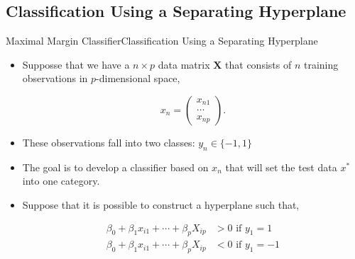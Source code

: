 \subsection{Classification Using a Separating Hyperplane}
\begin{frame}{Maximal Margin Classifier}{Classification Using a Separating Hyperplane}

\begin{itemize}
    \item Supposse that we have a $n \times p$ data matrix $\textbf{X}$ that consists of $n$ training observations in $p$-dimensional space, \pause 

    \begin{equation}
    x_n = 
    \begin{pmatrix}
    x_{n1} \\
    \hdots  \\
    x_{np} 
    \end{pmatrix}.
    \end{equation} \pause 

    \item These observations fall into two classes: $y_n \in \{ -1,1 \}$ \pause 

    \item The goal is to develop a classifier based on $x_n$ that will set the test data $x^*$ into one category. \pause 

    \item Suppose that it is possible to construct a hyperplane such that, \pause 

    \begin{align}
            \beta_0 + \beta_1 x_{i1} +  \cdots + \beta_{p} X_{ip} &> 0 \text{ if } y_1 = 1 \\ 
            \beta_0 + \beta_1 x_{i1} +  \cdots + \beta_{p} X_{ip} &< 0 \text{ if } y_1 = -1
    \end{align} \pause

\end{itemize}
    
\end{frame}

